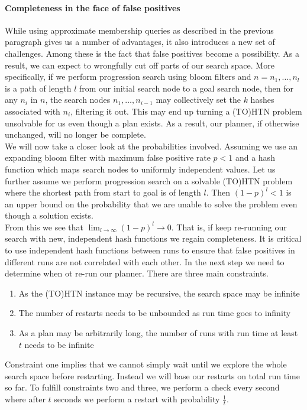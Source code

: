 \paragraph{Completeness in the face of false positives}
While using approximate membership queries as described in the previous paragraph gives us a number of advantages, it also introduces a new set of challenges. Among these is the fact that false positives become a possibility. As a result, we can expect to wrongfully cut off parts of our search space. More specifically, if we perform progression search using bloom filters and $n = n_1, \ldots, n_l$ is a path of length $l$ from our initial search node to a goal search node, then for any $n_i$ in $n$, the search nodes $n_1, \ldots, n_{i-1}$ may collectively set the $k$ hashes associated with $n_i$, filtering it out. This may end up turning a (TO)HTN problem unsolvable for us even though a plan exists. As a result, our planner, if otherwise unchanged, will no longer be complete. \\
We will now take a closer look at the probabilities involved. Assuming we use an expanding bloom filter with maximum false positive rate $p < 1$ and a hash function which maps search nodes to uniformly independent values. Let us further assume we perform progression search on a solvable (TO)HTN problem where the shortest path from start to goal is of length $l$. Then $(1 - p)^l < 1$ is an upper bound on the probability that we are unable to solve the problem even though a solution exists. \\
From this we see that $\lim_{l \rightarrow \infty} (1 - p)^l \rightarrow 0$. That is, if keep re-running our search with new, independent hash functions we regain completeness. It is critical to use independent hash functions between runs to ensure that false positives in different runs are not correlated with each other. In the next step we need to determine when ot re-run our planner. There are three main constraints.
\begin{enumerate}
	\item As the (TO)HTN instance may be recursive, the search space may be infinite
	\item The number of restarts needs to be unbounded as run time goes to infinity
	\item As a plan may be arbitrarily long, the number of runs with run time at least $t$ needs to be infinite
\end{enumerate}
Constraint one implies that we cannot simply wait until we explore the whole search space before restarting. Instead we will base our restarts on total run time so far. To fulfill constraints two and three, we perform a check every second where after $t$ seconds we perform a restart with probability $\frac{1}{t}$. \\
